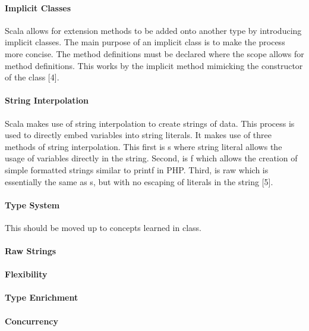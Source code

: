 \documentclass[12pt]{article}
\begin{document}
		\paragraph{Implicit Classes}Scala allows for extension methods to be added onto another type by introducing implicit classes. The main purpose of an implicit class is to make the process more concise. The method definitions must be declared where the scope allows for method definitions. This works by the implicit method mimicking the constructor of the class [4].

		\paragraph{String Interpolation} Scala makes use of string interpolation to create strings of data. This process is used to directly embed variables into string literals. It makes use of three methods of string interpolation. This first is s where string literal allows the usage of variables directly in the string. Second, is f which allows the creation of simple formatted strings similar to printf in PHP. Third, is raw which is essentially the same as s, but with no escaping of literals in the string [5].

		\paragraph{Type System}This should be moved up to concepts learned in class.
		
		\paragraph{Raw Strings}

		\paragraph{Flexibility}

		\paragraph{Type Enrichment}

		\paragraph{Concurrency}

\end{document}
